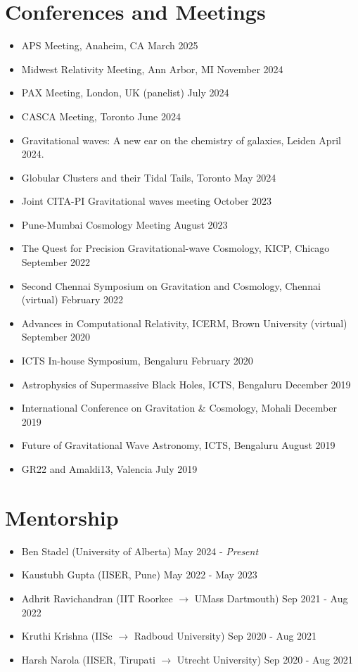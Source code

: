 		\section{Conferences and Meetings}
	\begin{itemize}[leftmargin=*]
		
		\item APS Meeting, Anaheim, CA \hfill March 2025
		\item Midwest Relativity Meeting, Ann Arbor, MI \hfill November 2024
		\item PAX Meeting, London, UK (panelist) \hfill July 2024 
		\item CASCA Meeting, Toronto \hfill June 2024 
		\item {Gravitational waves: A new ear on the chemistry of galaxies}, Leiden \hfill April 2024.
		\item {Globular Clusters and their Tidal Tails}, Toronto \hfill May 2024     
		\item {Joint CITA-PI Gravitational waves meeting} \hfill October 2023 
		\item Pune-Mumbai Cosmology Meeting \hfill August 2023
		\item The Quest for Precision Gravitational-wave Cosmology, KICP, Chicago \hfill September 2022
		\item {Second Chennai Symposium on Gravitation and Cosmology}, Chennai (virtual) \hfill February 2022
		\item {Advances in Computational Relativity}, ICERM, Brown University (virtual) \hfill September 2020
		\item {ICTS In-house Symposium}, Bengaluru \hfill February 2020 
		\item	{Astrophysics of Supermassive Black Holes}, ICTS, Bengaluru \hfill December 2019
		\item {International Conference on Gravitation \& Cosmology}, Mohali \hfill December 2019 
		\item {Future of Gravitational Wave Astronomy}, ICTS, Bengaluru \hfill August 2019
		\item {GR22 and Amaldi13}, Valencia \hfill July 2019 			
	\end{itemize}
	
		\section{Mentorship}
		\begin{itemize}[leftmargin=*]
			\item Ben Stadel (University of Alberta) \hfill May 2024 - \textit{Present}
			\item Kaustubh Gupta (IISER, Pune) \hfill May 2022 - May 2023
			\item Adhrit Ravichandran (IIT Roorkee $\rightarrow$ UMass Dartmouth) \hfill Sep 2021 - Aug 2022
			\item Kruthi Krishna (IISc $ \rightarrow $ Radboud University) \hfill Sep 2020 - Aug 2021
			\item Harsh Narola (IISER, Tirupati $ \rightarrow $ Utrecht University) \hfill Sep 2020 - Aug 2021
		\end{itemize}
		
